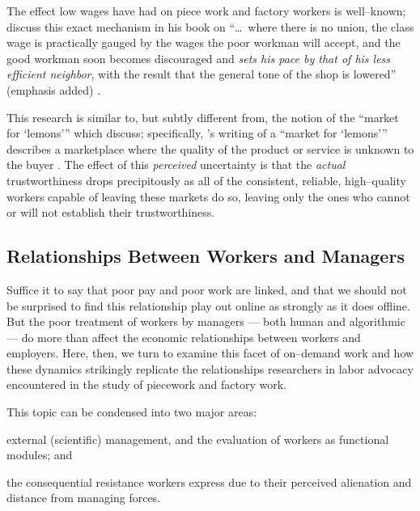 \documentclass[trackingWork]{subfiles}
\begin{document}
{%


The effect low wages have had on piece work and factory workers is well--known;
\citeauthor{gantt1913work} discuss this exact mechanism in his book on
``\dots~where there is no union,
the class wage is practically gauged by the wages the poor workman will accept,
and the good workman soon becomes discouraged and \textit{sets his pace by that of his less efficient neighbor},
with the result that the general tone of the shop is lowered'' (emphasis added)
\cite{gantt1913work}.

This research is similar to, but subtly different from, the notion of the ``market for `lemons'''
which \citeauthor{fort2011amazon} discuss;
specifically, \citeauthor{akerlof1970market}'s writing of a ``market for `lemons'''
describes a marketplace where the quality of the product or service is unknown to the buyer
\cite{fort2011amazon,akerlof1970market}.
The effect of this \textit{perceived} uncertainty is that
the \textit{actual} trustworthiness drops precipitously
as all of the consistent, reliable, high--quality workers capable of leaving these markets do so,
leaving only the ones who cannot or will not establish their trustworthiness.

\subsection{Relationships Between Workers and Managers}\label{sec:relationships}
Suffice it to say that poor pay and poor work are linked,
and that we should not be surprised to find this relationship play out online as strongly as it does offline.
But the poor treatment of workers by managers
--- both human and algorithmic ---
do more than affect the economic relationships between workers and employers.
Here, then, we turn to examine this facet of on--demand work
and how these dynamics strikingly replicate the relationships
researchers in labor advocacy encountered in the study of piecework and factory work.

This topic can be condensed into two major areas:
\begin{inlinelist}
\item external (scientific) management, and the evaluation of workers as functional modules; and
\item the consequential resistance workers express due to their perceived alienation and distance from managing forces.
\end{inlinelist}

}
\end{document}
